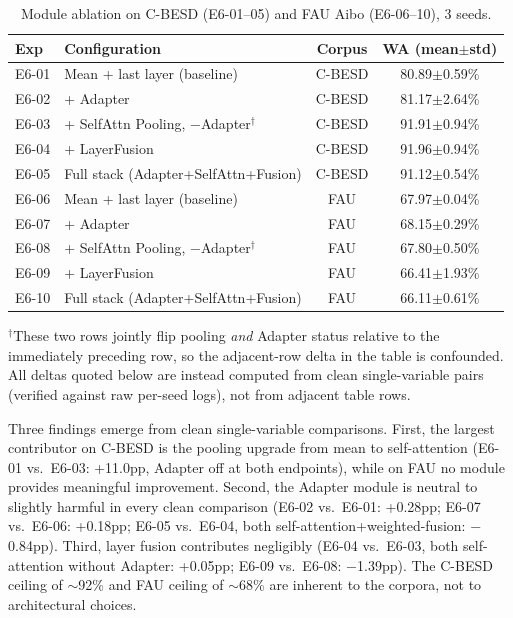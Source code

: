 \begin{table}[h]
\centering
\caption{Module ablation on C-BESD (E6-01--05) and FAU Aibo (E6-06--10), 3 seeds.}
\label{tab:b6}
\begin{tabular}{llcc}
\toprule
\textbf{Exp} & \textbf{Configuration} & \textbf{Corpus} & \textbf{WA (mean$\pm$std)} \\
\midrule
E6-01 & Mean + last layer (baseline)          & C-BESD & 80.89$\pm$0.59\% \\
E6-02 & + Adapter                            & C-BESD & 81.17$\pm$2.64\% \\
E6-03 & + SelfAttn Pooling, $-$Adapter$^\dagger$ & C-BESD & 91.91$\pm$0.94\% \\
E6-04 & + LayerFusion                        & C-BESD & 91.96$\pm$0.94\% \\
E6-05 & Full stack (Adapter+SelfAttn+Fusion) & C-BESD & 91.12$\pm$0.54\% \\
\addlinespace
E6-06 & Mean + last layer (baseline)          & FAU    & 67.97$\pm$0.04\% \\
E6-07 & + Adapter                            & FAU    & 68.15$\pm$0.29\% \\
E6-08 & + SelfAttn Pooling, $-$Adapter$^\dagger$ & FAU    & 67.80$\pm$0.50\% \\
E6-09 & + LayerFusion                        & FAU    & 66.41$\pm$1.93\% \\
E6-10 & Full stack (Adapter+SelfAttn+Fusion) & FAU    & 66.11$\pm$0.61\% \\
\bottomrule
\end{tabular}
\end{table}

\noindent $^\dagger$These two rows jointly flip pooling \emph{and} Adapter status relative to the immediately preceding row, so the adjacent-row delta in the table is confounded. All deltas quoted below are instead computed from clean single-variable pairs (verified against raw per-seed logs), not from adjacent table rows.

Three findings emerge from clean single-variable comparisons. First, the largest contributor on C-BESD is the pooling upgrade from mean to self-attention (E6-01 vs.\ E6-03: +11.0pp, Adapter off at both endpoints), while on FAU no module provides meaningful improvement. Second, the Adapter module is neutral to slightly harmful in every clean comparison (E6-02 vs.\ E6-01: +0.28pp; E6-07 vs.\ E6-06: +0.18pp; E6-05 vs.\ E6-04, both self-attention+weighted-fusion: $-$0.84pp). Third, layer fusion contributes negligibly (E6-04 vs.\ E6-03, both self-attention without Adapter: +0.05pp; E6-09 vs.\ E6-08: $-$1.39pp). The C-BESD ceiling of $\sim$92\% and FAU ceiling of $\sim$68\% are inherent to the corpora, not to architectural choices.

